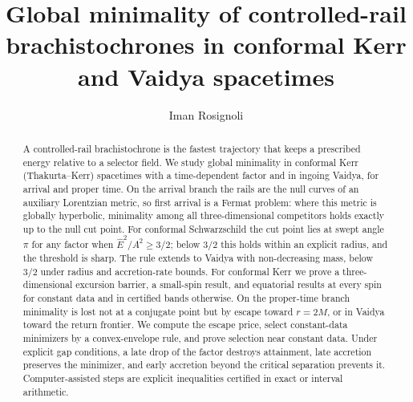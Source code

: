 \documentclass[aip,jmp,amsmath,amssymb,reprint]{revtex4-2}
\newcommand{\Ehat}{\hat E}
\theoremstyle{plain}
\theoremstyle{definition}
\begin{document}
\title{Global minimality of controlled-rail brachistochrones in conformal Kerr and Vaidya spacetimes}
\author{Iman Rosignoli}

\begin{abstract}
A controlled-rail brachistochrone is the fastest trajectory that keeps a prescribed energy relative to a selector
field. We study global minimality in conformal Kerr (Thakurta--Kerr) spacetimes with a time-dependent factor and
in ingoing Vaidya, for arrival and proper time. On the arrival branch the rails are the null curves of an
auxiliary Lorentzian metric, so first arrival is a Fermat problem: where this metric is globally hyperbolic,
minimality among all three-dimensional competitors holds exactly up to the null cut point. For conformal
Schwarzschild the cut point lies at swept angle $\pi$ for any factor when $\Ehat^2/A^2\ge3/2$; below $3/2$ this
holds within an explicit radius, and the threshold is sharp. The rule extends to Vaidya with non-decreasing mass,
below $3/2$ under radius and accretion-rate bounds. For conformal Kerr we prove a three-dimensional excursion
barrier, a small-spin result, and equatorial results at every spin for constant data and in certified bands
otherwise. On the proper-time branch minimality is lost not at a conjugate point but by escape toward $r=2M$, or
in Vaidya toward the return frontier. We compute the escape price, select constant-data minimizers by a
convex-envelope rule, and prove selection near constant data. Under explicit gap conditions, a late drop of the
factor destroys attainment, late accretion preserves the minimizer, and early accretion beyond the critical
separation prevents it. Computer-assisted steps are explicit inequalities certified in exact or interval
arithmetic.
\end{abstract}
\maketitle

\end{document}
